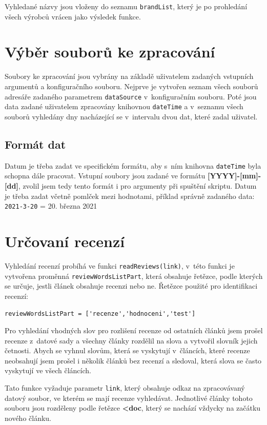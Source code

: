  Vyhledané názvy jsou vloženy do seznamu \verb|brandList|, který je po prohledání všech výrobců vrácen jako výsledek funkce.

\section{Výběr souborů ke zpracování}

Soubory ke zpracování jsou vybrány na základě uživatelem zadaných vstupních argumentů a konfiguračního souboru. Nejprve je vytvořen seznam všech souborů adresáře zadaného parametrem \verb|dataSource| v~konfiguračním souboru. Poté jsou data zadané uživatelem zpracovány knihovnou \verb|dateTime| a v~seznamu všech souborů vyhledány dny nacházející se v~intervalu dvou dat, které zadal uživatel.

\subsection*{Formát dat}

Datum je třeba zadat ve specifickém formátu, aby s~ním knihovna \verb|dateTime| byla schopna dále pracovat. Vstupní soubory jsou zadané ve formátu \textbf{[YYYY]-[mm]-[dd]}, zvolil jsem tedy tento formát i pro argumenty při spuštění skriptu. Datum je třeba zadat včetně pomlček mezi hodnotami, příklad správně zadaného data: \verb|2021-3-20| = 20. března 2021

\section{Určovaní recenzí}
Vyhledání recenzí probíhá ve funkci \verb|readReviews(link)|, v~této funkci je vytvořena proměnná \verb|reviewWordsListPart|, která obsahuje řetězce, podle kterých se určuje, jestli článek obsahuje recenzi nebo ne. Řetězce použité pro identifikaci recenzí:
\begin{center}
    \verb|reviewWordsListPart = ['recenze','hodnoceni','test']|
\end{center}Pro vyhledání vhodných slov pro rozlišení recenze od ostatních článků jsem prošel recenze z~datové sady a všechny články rozdělil na slova a vytvořil slovník jejich četnosti. Abych se vyhnul slovům, která se vyskytují v~článcích, které recenze neobsahují jsem prošel i několik článků bez recenzí a sledoval, která slova se často vyskytují ve všech článcích.

Tato funkce vyžaduje parametr \verb|link|, který obsahuje odkaz na zpracovávaný datový soubor, ve kterém se mají recenze vyhledávat. Jednotlivé články tohoto souboru jsou rozděleny podle řetězce \textbf{<doc}, který se nachází vždycky na začátku nového článku. 

